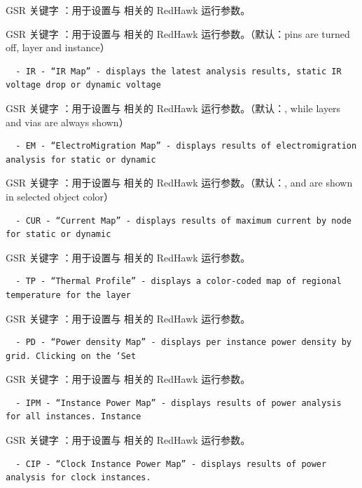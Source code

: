 GSR 关键字 ：用于设置与  相关的 RedHawk 运行参数。

GSR 关键字 ：用于设置与  相关的 RedHawk 运行参数。（默认：pins are turned off, layer and instance）

\begin{lstlisting}
  - IR - “IR Map” - displays the latest analysis results, static IR voltage drop or dynamic voltage
\end{lstlisting}

GSR 关键字 ：用于设置与  相关的 RedHawk 运行参数。（默认：, while layers and vias are always shown）

\begin{lstlisting}
  - EM - “ElectroMigration Map” - displays results of electromigration analysis for static or dynamic
\end{lstlisting}

GSR 关键字 ：用于设置与  相关的 RedHawk 运行参数。（默认：, and are shown in selected object color）

\begin{lstlisting}
  - CUR - “Current Map” - displays results of maximum current by node for static or dynamic
\end{lstlisting}

GSR 关键字 ：用于设置与  相关的 RedHawk 运行参数。

\begin{lstlisting}
  - TP - “Thermal Profile” - displays a color-coded map of regional temperature for the layer
\end{lstlisting}

GSR 关键字 ：用于设置与  相关的 RedHawk 运行参数。

\begin{lstlisting}
  - PD - “Power density Map” - displays per instance power density by grid. Clicking on the ‘Set
\end{lstlisting}

GSR 关键字 ：用于设置与  相关的 RedHawk 运行参数。

\begin{lstlisting}
  - IPM - “Instance Power Map” - displays results of power analysis for all instances. Instance
\end{lstlisting}

GSR 关键字 ：用于设置与  相关的 RedHawk 运行参数。

\begin{lstlisting}
  - CIP - “Clock Instance Power Map” - displays results of power analysis for clock instances.
\end{lstlisting}

